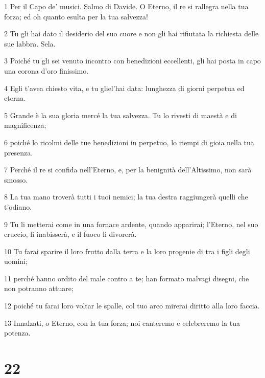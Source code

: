 \par 1 Per il Capo de' musici. Salmo di Davide. O Eterno, il re si rallegra nella tua forza; ed oh quanto esulta per la tua salvezza!
\par 2 Tu gli hai dato il desiderio del suo cuore e non gli hai rifiutata la richiesta delle sue labbra. Sela.
\par 3 Poiché tu gli sei venuto incontro con benedizioni eccellenti, gli hai posta in capo una corona d'oro finissimo.
\par 4 Egli t'avea chiesto vita, e tu gliel'hai data: lunghezza di giorni perpetua ed eterna.
\par 5 Grande è la sua gloria mercé la tua salvezza. Tu lo rivesti di maestà e di magnificenza;
\par 6 poiché lo ricolmi delle tue benedizioni in perpetuo, lo riempi di gioia nella tua presenza.
\par 7 Perché il re si confida nell'Eterno, e, per la benignità dell'Altissimo, non sarà smosso.
\par 8 La tua mano troverà tutti i tuoi nemici; la tua destra raggiungerà quelli che t'odiano.
\par 9 Tu li metterai come in una fornace ardente, quando apparirai; l'Eterno, nel suo cruccio, li inabisserà, e il fuoco li divorerà.
\par 10 Tu farai sparire il loro frutto dalla terra e la loro progenie di tra i figli degli uomini;
\par 11 perché hanno ordito del male contro a te; han formato malvagi disegni, che non potranno attuare;
\par 12 poiché tu farai loro voltar le spalle, col tuo arco mirerai diritto alla loro faccia.
\par 13 Innalzati, o Eterno, con la tua forza; noi canteremo e celebreremo la tua potenza.

\chapter{22}

